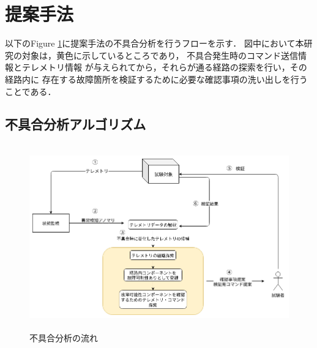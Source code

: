 \documentclass[11pt]{article}
\begin{document}
%

\section{提案手法}
以下のFigure \ref{fig:fault_diagnosis}に提案手法の不具合分析を行うフローを示す．
図中において本研究の対象は，黄色に示しているところであり，
不具合発生時のコマンド送信情報とテレメトリ情報
が与えられてから，それらが通る経路の探索を行い，その経路内に
存在する故障箇所を検証するために必要な確認事項の洗い出しを行うことである．

\subsection{不具合分析アルゴリズム}

\begin{figure}[H]
   \centering
      \includegraphics[height=8.0cm]{figure/fault_diagnosis_flow.png}
      \caption{不具合分析の流れ}
      \label{fig:fault_diagnosis}
\end{figure}
\end{document}
